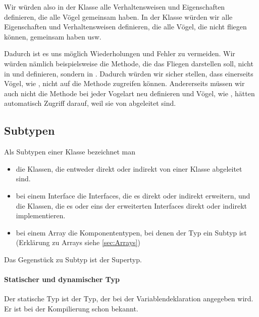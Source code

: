 \documentclass{tuda-pub}
\begin{document}
  Wir würden also in der Klasse  alle Verhaltensweisen und Eigenschaften
  definieren, die alle Vögel gemeinsam haben. In der Klasse  würden wir
  alle Eigenschaften und Verhaltensweisen definieren, die alle Vögel, die nicht fliegen können,
  gemeinsam haben usw.

  \br

  Dadurch ist es uns möglich Wiederholungen und Fehler zu vermeiden. Wir würden nämlich
  beispielsweise die Methode, die das Fliegen darstellen soll, nicht in  und
   definieren, sondern in . Dadurch würden wir
  sicher stellen, dass einerseits Vögel, wie , nicht auf die Methode
  zugreifen können. Andererseits müssen wir auch nicht die Methode bei jeder Vogelart neu
  definieren und Vögel, wie , hätten automatisch Zugriff darauf, weil sie von
   abgeleitet sind.

  \subsection{Subtypen}
  \label{sec:Subtypen}
  Als Subtypen einer Klasse bezeichnet man

  \begin{itemize}
    \item die Klassen, die entweder direkt  oder indirekt von einer Klasse
    abgeleitet sind.
    \item bei einem Interface die Interfaces, die es direkt oder indirekt erweitern, und die
    Klassen, die es oder eins der erweiterten Interfaces direkt oder indirekt implementieren.
    \item bei einem Array die Komponententypen, bei denen der Typ ein Subtyp ist (Erklärung zu
    Arrays siehe \ref{sec:Arrays})
  \end{itemize}

  Das Gegenstück zu Subtyp ist der Supertyp.

  \paragraph{Statischer und dynamischer Typ}
  \label{par:Statischer_und_dynamischer_Typ}

  Der statische Typ ist der Typ, der bei der Variablendeklaration angegeben wird. Er ist bei der
  Kompilierung schon bekannt.
\end{document}
